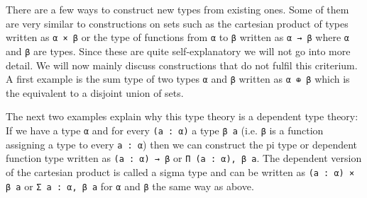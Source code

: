 There are a few ways to construct new types from existing ones. 
Some of them are very similar to constructions on sets such as the cartesian product of types written as \lstinline{α × β} or the type of functions from \lstinline{α} to \lstinline{β} written as \lstinline{α → β} where \lstinline{α} and \lstinline{β} are types.
Since these are quite self-explanatory we will not go into more detail.
We will now mainly discuss constructions that do not fulfil this criterium. 
A first example is the sum type of two types \lstinline{α} and \lstinline{β} written as \lstinline{α ⊕ β} which is the equivalent to a disjoint union of sets. 

The next two examples explain why this type theory is a dependent type theory:
If we have a type \lstinline{α} and for every \lstinline{(a : α)} a type \lstinline{β a} (i.e. \lstinline{β} is a function assigning a type to every \lstinline{a : α}) then we can construct the pi type or dependent function type written as \lstinline{(a : α) → β} or \lstinline{Π (a : α), β a}. 
The dependent version of the cartesian product is called a sigma type and can be written as \lstinline{(a : α) × β a} or \lstinline{Σ a : α, β a} for \lstinline{α} and \lstinline{β} the same way as above.